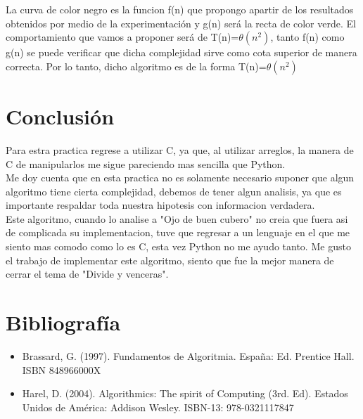 \documentclass[spanish]{article}
\begin{document}
La curva de color negro es la funcion f(n) que propongo apartir de los resultados obtenidos por medio de la experimentación y g(n) será la recta de color verde. El comportamiento que vamos a proponer será de T(n)=${\theta(n^{2})}$, tanto f(n) como g(n) se puede verificar que dicha complejidad sirve como cota superior de manera correcta. Por lo tanto, dicho algoritmo es de la forma T(n)=${\theta(n^{2})}$

	\bigskip

	\newpage

	\bigskip

	\section{Conclusi\'on}

	\bigskip

	Para estra practica regrese a utilizar C, ya que, al utilizar arreglos, la manera de C de manipularlos me sigue pareciendo mas sencilla que Python.\\Me doy cuenta que en esta practica no es solamente necesario suponer que algun algoritmo tiene cierta complejidad, debemos de tener algun analisis, ya que es importante respaldar toda nuestra hipotesis con informacion verdadera.\\Este algoritmo, cuando lo analise a "Ojo de buen cubero" no creia que fuera asi de complicada su implementacion, tuve que regresar a un lenguaje en el que me siento mas comodo como lo es C, esta vez Python no me ayudo tanto. Me gusto el trabajo de implementar este algoritmo, siento que fue la mejor manera de cerrar el tema de "Divide y venceras".

	\bigskip


	\newpage

	\bigskip

	\section{Bibliografía}
	\begin{itemize}
		\item Brassard, G. (1997). Fundamentos de Algoritmia. España: Ed. Prentice Hall. ISBN 		848966000X
		\item Harel, D. (2004). Algorithmics: The spirit of Computing (3rd. Ed). Estados Unidos de América: Addison
Wesley. ISBN-13: 978-0321117847
	\end{itemize}
\end{document}
